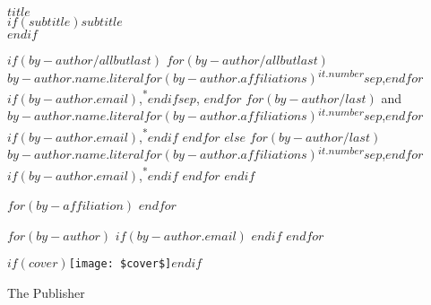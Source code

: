 \begin{minipage}[b][\textheight][s]{0.85\textwidth}
{\large\bfseries\nohyphens{$title$}}\\[2\baselineskip] %
$if(subtitle)${\large\textit{$subtitle$}}\\[4\baselineskip]$endif$
		
$if(by-author/allbutlast)$
$for(by-author/allbutlast)$
 {\large{$by-author.name.literal$}}$for(by-author.affiliations)${\textsuperscript{$it.number$}}$sep$,$endfor$$if(by-author.email)$,{\textsuperscript{*}}$endif$$sep$, 
$endfor$
$for(by-author/last)$
 {and \large{$by-author.name.literal$}}$for(by-author.affiliations)${\textsuperscript{$it.number$}}$sep$,$endfor$$if(by-author.email)$,{\textsuperscript{*}}$endif$
$endfor$
$else$
$for(by-author/last)$
 {\large{$by-author.name.literal$}}$for(by-author.affiliations)${\textsuperscript{$it.number$}}$sep$,$endfor$$if(by-author.email)$,{\textsuperscript{*}}$endif$
$endfor$
$endif$


$for(by-affiliation)$
$endfor$

$for(by-author)$
$if(by-author.email)$
$endif$
$endfor$



\vfill


$if(cover)$\texttt{[image: \$cover\$]}$endif$

\vspace{0.25\textheight} 

{\noindent The Publisher~~\plogo}\\[\baselineskip] %
\end{minipage}